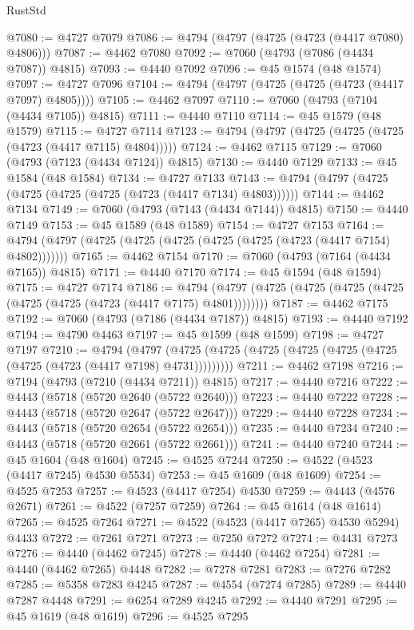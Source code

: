 \begin{lexlean}{RustStd}
\begin{coremodule}
@7080 := @4727 @7079
@7086 := @4794 (@4797 (@4725 (@4723 (@4417 @7080) @4806)))
@7087 := @4462 @7080
@7092 := @7060 (@4793 (@7086 (@4434 @7087)) @4815)
@7093 := @4440 @7092
@7096 := @45 @1574 (@48 @1574)
@7097 := @4727 @7096
@7104 := @4794 (@4797 (@4725 (@4725 (@4723 (@4417 @7097) @4805))))
@7105 := @4462 @7097
@7110 := @7060 (@4793 (@7104 (@4434 @7105)) @4815)
@7111 := @4440 @7110
@7114 := @45 @1579 (@48 @1579)
@7115 := @4727 @7114
@7123 := @4794 (@4797 (@4725 (@4725 (@4725 (@4723 (@4417 @7115) @4804)))))
@7124 := @4462 @7115
@7129 := @7060 (@4793 (@7123 (@4434 @7124)) @4815)
@7130 := @4440 @7129
@7133 := @45 @1584 (@48 @1584)
@7134 := @4727 @7133
@7143 := @4794 (@4797 (@4725 (@4725 (@4725 (@4725 (@4723 (@4417 @7134) @4803))))))
@7144 := @4462 @7134
@7149 := @7060 (@4793 (@7143 (@4434 @7144)) @4815)
@7150 := @4440 @7149
@7153 := @45 @1589 (@48 @1589)
@7154 := @4727 @7153
@7164 := @4794 (@4797 (@4725 (@4725 (@4725 (@4725 (@4725 (@4723 (@4417 @7154) @4802)))))))
@7165 := @4462 @7154
@7170 := @7060 (@4793 (@7164 (@4434 @7165)) @4815)
@7171 := @4440 @7170
@7174 := @45 @1594 (@48 @1594)
@7175 := @4727 @7174
@7186 := @4794 (@4797 (@4725 (@4725 (@4725 (@4725 (@4725 (@4725 (@4723 (@4417 @7175) @4801))))))))
@7187 := @4462 @7175
@7192 := @7060 (@4793 (@7186 (@4434 @7187)) @4815)
@7193 := @4440 @7192
@7194 := @4790 @4463
@7197 := @45 @1599 (@48 @1599)
@7198 := @4727 @7197
@7210 := @4794
    (@4797 (@4725 (@4725 (@4725 (@4725 (@4725 (@4725 (@4725 (@4723 (@4417 @7198) @4731)))))))))
@7211 := @4462 @7198
@7216 := @7194 (@4793 (@7210 (@4434 @7211)) @4815)
@7217 := @4440 @7216
@7222 := @4443 (@5718 (@5720 @2640 (@5722 @2640)))
@7223 := @4440 @7222
@7228 := @4443 (@5718 (@5720 @2647 (@5722 @2647)))
@7229 := @4440 @7228
@7234 := @4443 (@5718 (@5720 @2654 (@5722 @2654)))
@7235 := @4440 @7234
@7240 := @4443 (@5718 (@5720 @2661 (@5722 @2661)))
@7241 := @4440 @7240
@7244 := @45 @1604 (@48 @1604)
@7245 := @4525 @7244
@7250 := @4522 (@4523 (@4417 @7245) @4530 @5534)
@7253 := @45 @1609 (@48 @1609)
@7254 := @4525 @7253
@7257 := @4523 (@4417 @7254) @4530
@7259 := @4443 (@4576 @2671)
@7261 := @4522 (@7257 @7259)
@7264 := @45 @1614 (@48 @1614)
@7265 := @4525 @7264
@7271 := @4522 (@4523 (@4417 @7265) @4530 @5294) @4433
@7272 := @7261 @7271
@7273 := @7250 @7272
@7274 := @4431 @7273
@7276 := @4440 (@4462 @7245)
@7278 := @4440 (@4462 @7254)
@7281 := @4440 (@4462 @7265) @4448
@7282 := @7278 @7281
@7283 := @7276 @7282
@7285 := @5358 @7283 @4245
@7287 := @4554 (@7274 @7285)
@7289 := @4440 @7287 @4448
@7291 := @6254 @7289 @4245
@7292 := @4440 @7291
@7295 := @45 @1619 (@48 @1619)
@7296 := @4525 @7295

\end{coremodule}
\end{lexlean}
